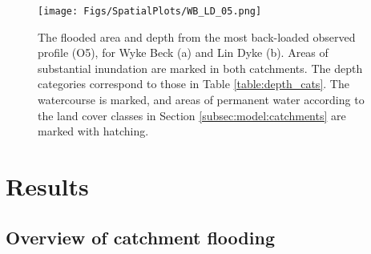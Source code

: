 \documentclass[APA,Times2COL]{WileyNJDv5}
\begin{document}
\begin{figure}[h!]
    \centering
 \texttt{[image: Figs/SpatialPlots/WB\_LD\_05.png]}
  
   \caption{The flooded area and depth from the most back-loaded observed profile (O5), for Wyke Beck (a) and Lin Dyke (b). Areas of substantial inundation are marked in both catchments. The depth categories correspond to those in Table \ref{table:depth_cats}. The watercourse is marked, and areas of permanent water according to the land cover classes in Section \ref{subsec:model:catchments} are marked with hatching.}\label{fig:flooded_area_spatial_BL} 
\end{figure}


\section{Results}\label{sec:results}

\subsection{Overview of catchment flooding}\label{subsec:overview}
\end{document}

